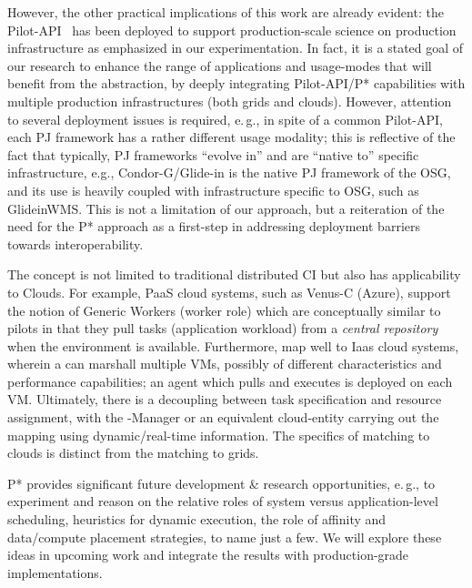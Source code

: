 \documentclass[conference]{IEEEtran}
\begin{document}
However, the other practical implications of this work are already
evident: the Pilot-API~\cite{pilot_api} has been deployed to support
production-scale science on production infrastructure as emphasized 
in our experimentation. In fact, it is a stated goal of our research to
enhance the range of applications and usage-modes that will benefit
from the \pilot abstraction, by deeply integrating Pilot-API/P*
capabilities with multiple production infrastructures (both grids and
clouds).  However, attention to several deployment issues is required,
e.\,g., in spite
of a common Pilot-API, each PJ framework has a rather different usage
modality; this is reflective of the fact that typically, PJ frameworks
``evolve in'' and are ``native to'' specific infrastructure, e.g.,
Condor-G/Glide-in is the native PJ framework of the OSG, and its use
is heavily coupled with infrastructure specific to OSG, such as
GlideinWMS. This is not a limitation of our approach, but a
reiteration of the need for the P* approach as a first-step in
addressing deployment barriers towards interoperability.

The \pilotjobs concept is not limited to traditional distributed CI but also
has applicability to Clouds. For example, PaaS cloud systems, such as Venus-C
(Azure), support the notion of Generic Workers (worker role) which are
conceptually similar to pilots in that they pull tasks (application workload)
from a {\it central repository} when the environment is available.
Furthermore, \pilotjobs map well to Iaas cloud systems, wherein a \pilot can
marshall multiple VMs, possibly of different characteristics and performance
capabilities; an agent which pulls and executes \cus is deployed on each VM.
Ultimately, there is a decoupling between task specification and resource
assignment, with the \pilot-Manager or an equivalent cloud-entity carrying 
out the mapping using dynamic/real-time information.
The specifics of matching \cus to clouds is distinct from the
matching \cus to grids.

P* provides significant future development \& research opportunities, e.\,g.,
to experiment and reason on the relative roles of system versus
application-level scheduling, heuristics for dynamic execution, the role of
affinity and data/compute placement strategies, to name just a few. We will
explore these ideas in upcoming work and integrate the results with
production-grade implementations.
\end{document}
